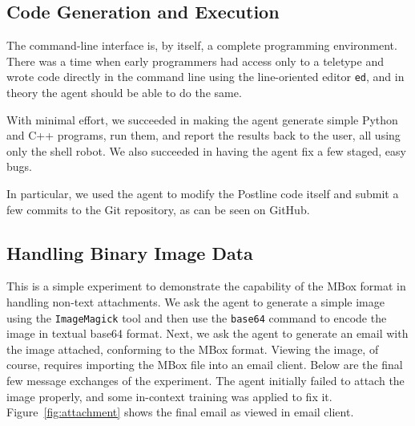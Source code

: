 \subsection{Code Generation and Execution}

The command-line interface is, by itself, a complete programming environment. There was a time when early programmers had access only to a teletype and wrote code directly in the command line using the line-oriented editor \texttt{ed}, and in theory the agent should be able to do the same.

With minimal effort, we succeeded in making the agent generate simple Python and C++ programs, run them, and report the results back to the user, all using only the shell robot. We also succeeded in having the agent fix a few staged, easy bugs.

In particular, we used the agent to modify the Postline code itself and submit a few commits to the Git repository, as can be seen on GitHub.

\subsection{Handling Binary Image Data}
\label{sec:expr-image}

This is a simple experiment to demonstrate the capability of the MBox
format in handling non-text attachments. We ask the agent to generate
a simple image using the \texttt{ImageMagick} tool and then use the
\texttt{base64} command to encode the image in textual base64 format.
Next, we ask the agent to generate an email with the image attached,
conforming to the MBox format. Viewing the image, of course, requires
importing the MBox file into an email client.
Below are the final few message exchanges
of the experiment. The agent initially failed to attach the image
properly, and some in-context training was applied to fix it.  Figure~\ref{fig:attachment} shows the final email as viewed in email client.


